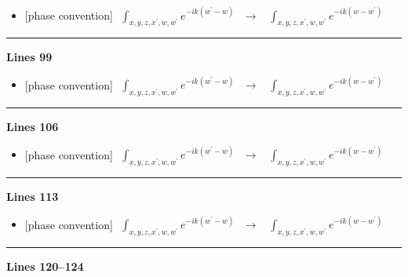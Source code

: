\documentclass[10pt]{article}
\begin{document}
\begin{itemize}[leftmargin=2.2em,itemsep=1pt,topsep=2pt]
\item[\textbf{l.94}] \textsf{\small [phase convention]} $\displaystyle \,\,\int_{x,y,z,x^{\prime},w,w^{\prime}}e^{-ik(w^{\prime}-w)}\,$\ $\longrightarrow$\ $\displaystyle \,\,\int_{x,y,z,x^{\prime},w,w^{\prime}}e^{-ik(w-w^{\prime})}\,$
\end{itemize}
\noindent\rule{\linewidth}{0.3pt}\par\noindent\textbf{Lines 99} \par
\begin{itemize}[leftmargin=2.2em,itemsep=1pt,topsep=2pt]
\item[\textbf{l.99}] \textsf{\small [phase convention]} $\displaystyle \,\,\int_{x,y,z,x^{\prime},w,w^{\prime}}e^{-ik(w^{\prime}-w)}\,$\ $\longrightarrow$\ $\displaystyle \,\,\int_{x,y,z,x^{\prime},w,w^{\prime}}e^{-ik(w-w^{\prime})}\,$
\end{itemize}
\noindent\rule{\linewidth}{0.3pt}\par\noindent\textbf{Lines 106} \par
\begin{itemize}[leftmargin=2.2em,itemsep=1pt,topsep=2pt]
\item[\textbf{l.106}] \textsf{\small [phase convention]} $\displaystyle \,\,\int_{x,y,z,x^{\prime},w,w^{\prime}}e^{-ik(w^{\prime}-w)}\,$\ $\longrightarrow$\ $\displaystyle \,\,\int_{x,y,z,x^{\prime},w,w^{\prime}}e^{-ik(w-w^{\prime})}\,$
\end{itemize}
\noindent\rule{\linewidth}{0.3pt}\par\noindent\textbf{Lines 113} \par
\begin{itemize}[leftmargin=2.2em,itemsep=1pt,topsep=2pt]
\item[\textbf{l.113}] \textsf{\small [phase convention]} $\displaystyle \,\,\int_{x,y,z,x^{\prime},w,w^{\prime}}e^{-ik(w^{\prime}-w)}\,$\ $\longrightarrow$\ $\displaystyle \,\,\int_{x,y,z,x^{\prime},w,w^{\prime}}e^{-ik(w-w^{\prime})}\,$
\end{itemize}
\noindent\rule{\linewidth}{0.3pt}\par\noindent\textbf{Lines 120--124} \par
\end{document}
